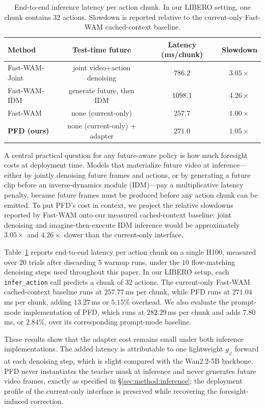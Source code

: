 \documentclass{article}
\begin{document}
\begin{table}[h]
\centering
\small
\caption{
End-to-end inference latency per action chunk. In our LIBERO setting, one
chunk contains $32$ actions. Slowdown is reported relative to the current-only
Fast-WAM cached-context baseline.
}
\label{tab:overhead}
\begin{tabular}{lccc}
\toprule
\textbf{Method} & \textbf{Test-time future} & \textbf{Latency (ms/chunk)} & \textbf{Slowdown} \\
\midrule
Fast-WAM-Joint  & joint video+action denoising  & $786.2$  & $3.05\times$ \\
Fast-WAM-IDM    & generate future, then IDM      & $1098.1$ & $4.26\times$ \\
\midrule
Fast-WAM        & none (current-only)            & $257.7$  & $1.00\times$ \\
\textbf{PFD (ours)} & none (current-only) + adapter & $\mathbf{271.0}$ & $\mathbf{1.05\times}$ \\
\bottomrule
\end{tabular}
\end{table}

A central practical question for any future-aware policy is how much foresight
costs at deployment time. Models that materialize future video at inference---
either by jointly denoising future frames and actions, or by generating a future
clip before an inverse-dynamics module (IDM)---pay a multiplicative latency
penalty, because future frames must be produced before any action chunk can be
emitted. To put PFD's cost in context, we project the relative slowdowns reported
by Fast-WAM onto our measured cached-context baseline: joint denoising and
imagine-then-execute IDM inference would be approximately $3.05\times$ and
$4.26\times$ slower than the current-only interface.

Table~\ref{tab:overhead} reports end-to-end latency per action chunk on a single
H100, measured over $20$ trials after discarding $5$ warmup runs, under the
$10$ flow-matching denoising steps used throughout this paper. In our LIBERO
setup, each \texttt{infer\_action} call predicts a chunk of $32$ actions. The
current-only Fast-WAM cached-context baseline runs at $257.77$\,ms per chunk,
while PFD runs at $271.04$\,ms per chunk, adding $13.27$\,ms or $5.15\%$
overhead. We also evaluate the prompt-mode implementation of PFD, which runs at
$282.29$\,ms per chunk and adds $7.80$\,ms, or $2.84\%$, over its corresponding
prompt-mode baseline.

These results show that the adapter cost remains small under both inference
implementations. The added latency is attributable to one lightweight
$g_\varphi$ forward at each denoising step, which is slight compared with the
Wan2.2-5B backbone. PFD never instantiates the teacher mask at inference and
never generates future video frames, exactly as specified in
\S\ref{sec:method:inference}; the deployment profile of the current-only
interface is preserved while recovering the foresight-induced correction.
\end{document}
